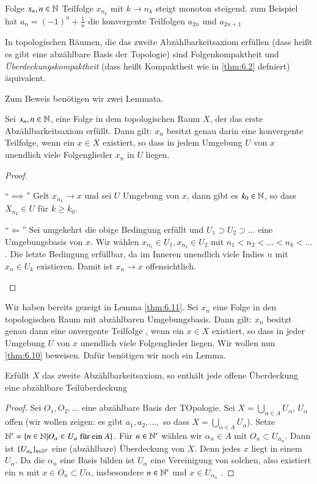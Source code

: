 \documentclass[a4paper,10pt]{scrartcl}
\begin{document}
\begin{ex*}
 Folge $x_n, n\in \mathbb{N}$ Teilfolge $x_{n_k}$ mit $k\to n_k$ steigt monoton steigend. zum Beispiel hat $a_n=(-1)^n+\frac 1 n$ die konvergente Teilfolgen $a_{2n}$ und $a_{2n+1}$
\end{ex*}
\begin{st}\label{thm:6.10}
 In topologischen Räumen, die das zweite Abzählbarkeitsaxiom erfüllen (dass heißt es gibt eine abzählbare Basis der Topologie) sind Folgenkompaktheit und \emph{Überdeckungskompaktheit} (dass heißt Kompaktheit wie in \ref{thm:6.2} defniert) äquivalent.
\end{st}
Zum Beweis benötigen wir zwei Lemmata.
\begin{lem}\label{thm:6.11}
 Sei $x_n, n\in \mathbb{N}$, eine Folge in dem topologischen Raum $X$, der das erste Abzählbarkeitsaxiom erfüllt.  Dann gilt: $x_n$ besitzt genau darin eine konvergente Teilfolge, wenn ein $x\in X$ existiert, so dass in jedem Umgebung $U$ von $x$ unendlich viele Folgenglieder $x_n$ in $U$ liegen.
\end{lem}
\begin{proof}
 \begin{seg}{"`$\implies$"'}
  Gelt $x_{n_k}\to x$ und sei $U$ Umgebung von $x$, dann gibt es $k_0\in \mathbb{N}$, so dass $X_{n_k}\in U$ für $k\ge k_0$.
 \end{seg}
\begin{seg}{"`$\Longleftarrow$"'}
 Sei umgekehrt die obige Bedingung erfüllt und $U_1\supset U_2 \supset ...$ eine Umgebungsbasis von $x$. Wir wählen
$x_{n_1}\in U_1, x_{n_2}\in U_2$ mit $n_1<n_2<...<n_k<...$. Die letzte Bedingung erfüllbar, da im Inneren unendlich viele Indies $n$ mit $x_n\in U_k$ existieren. Damit ist $x_n\to x$ offensichtlich.
\end{seg}
\end{proof}
 Wir haben bereits gezeigt in Lemma \ref{thm:6.11}. Sei $x_n$ eine Folge in den topologischen Raum  mit abzählbaren Umgebungsbasis. Dann gilt: $x_n$ besitzt genau dann eine onvergente Teilfolge , wenn ein $x\in X$ existiert, so dass 
in jeder Umgebung $U$ von $x$ unendlich viele Folgenglieder liegen. Wir wollen nun \ref{thm:6.10} beweisen. Dafür benötigen wir noch ein Lemma.
\begin{lem}\label{thm:6.12}
 Erfüllt $X$ das zweite Abzählbarkeitsaxiom,  so enthält jede offene Überdeckung eine abzählbare Teilüberdeckung
\end{lem}
\begin{proof}
 Sei $O_1,O_2,...$ eine abzählbare Basis der TOpologie. Sei $X=\bigcup_{\alpha\in A} U_\alpha$, $U_\alpha$ 
offen (wir wollen zeigen:  es gibt $a_1, a_2,...,$ so dass $X=\bigcup_{\alpha\in A}U_\alpha$). 
Setze $\mathbb{N}'=\{n\in \mathbb{N}|O_\alpha\in U_\alpha \text{ für ein } A\}$.
Für $n\in \mathbb{N}'$ wählen wir $\alpha_n\in A$ mit $O_n\subset U_{\alpha_n}$. Dann ist $\{U_{\alpha_n}\}_{n\in \mathbb{N}'}$ eine (abzählbare) Überdeckung von $X$. 
Denn jedes $x$ liegt in einem $U_\alpha$. Da die $\alpha_n$ eine Basis bilden ist $U_\alpha$ eine Vereinigung von solchen, also existiert ein $n$ mit $x\in O_n\subset U\alpha$, insbesondere $n\in \mathbb{N}'$ und $x\in U_{\alpha_n}$ .
\end{proof}
\end{document}
